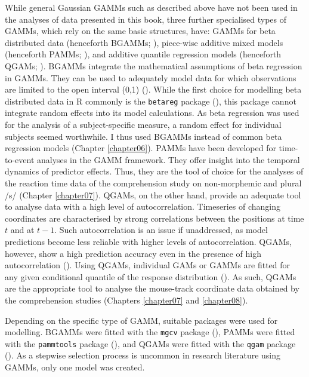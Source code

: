 While general Gaussian GAMMs such as described above have not been used in the analyses of data presented in this book, three further specialised types of GAMMs, which rely on the same basic structures, have: GAMMs for beta distributed data (henceforth BGAMMs; \cite{Wood2017}), piece-wise additive mixed models (henceforth PAMMs; \cite{Bender2018a}), and additive quantile regression models (henceforth QGAMs; \cite{Fasiolo2021}). BGAMMs integrate the mathematical assumptions of beta regression in GAMMs. They can be used to adequately model data for which observations are limited to the open interval (0,1) (\cite{Ferrari2004, Smithson2006}). While the first choice for modelling beta distributed data in R commonly is the \texttt{betareg} package (\cite{Cribari2010}), this package cannot integrate random effects into its model calculations. As beta regression was used for the analysis of a subject-specific measure, a random effect for individual subjects seemed worthwhile. I thus used BGAMMs instead of common beta regression models (Chapter \ref{chapter06}). PAMMs have been developed for time-to-event analyses in the GAMM framework. They offer insight into the temporal dynamics of predictor effects. Thus, they are the tool of choice for the analyses of the reaction time data of the comprehension study on non-morphemic and plural /s/ (Chapter \ref{chapter07}). QGAMs, on the other hand, provide an adequate tool to analyse data with a high level of autocorrelation. Timeseries of changing coordinates are characterised by strong correlations between the positions at time $t$ and at $t-1$. Such autocorrelation is an issue if unaddressed, as model predictions become less reliable with higher levels of autocorrelation. QGAMs, however, show a high prediction accuracy even in the presence of high autocorrelation (\cite{Fasiolo2021}). Using QGAMs, individual GAMs or GAMMs are fitted for any given conditional quantile of the response distribution (\cite{Tomaschek2021}). As such, QGAMs are the appropriate tool to analyse the mouse-track coordinate data obtained by the comprehension studies (Chapters \ref{chapter07} and \ref{chapter08}). 

Depending on the specific type of GAMM, suitable packages were used for modelling. BGAMMs were fitted with the \texttt{mgcv} package (\cite{Wood2017}), PAMMs were fitted with the \texttt{pammtools} package (\cite{Bender2018a}), and QGAMs were fitted with the \texttt{qgam} package (\cite{Fasiolo2021}). As a stepwise selection process is uncommon in research literature using GAMMs, only one model was created.

